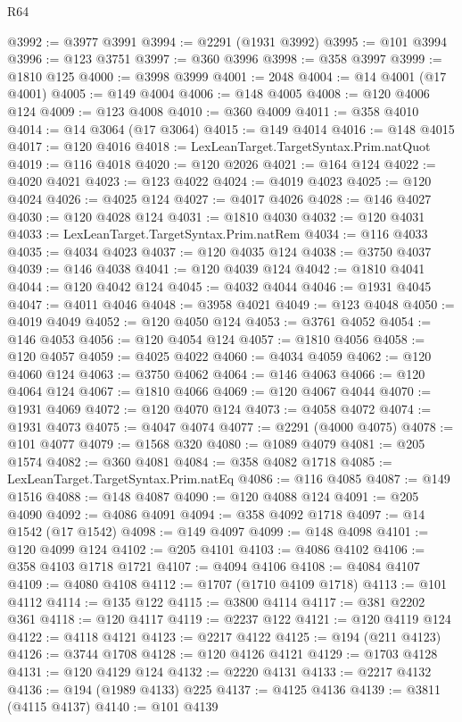 \begin{lexlean}{R64}
\begin{coremodule}
@3992 := @3977 @3991
@3994 := @2291 (@1931 @3992)
@3995 := @101 @3994
@3996 := @123 @3751
@3997 := @360 @3996
@3998 := @358 @3997
@3999 := @1810 @125
@4000 := @3998 @3999
@4001 := 2048
@4004 := @14 @4001 (@17 @4001)
@4005 := @149 @4004
@4006 := @148 @4005
@4008 := @120 @4006 @124
@4009 := @123 @4008
@4010 := @360 @4009
@4011 := @358 @4010
@4014 := @14 @3064 (@17 @3064)
@4015 := @149 @4014
@4016 := @148 @4015
@4017 := @120 @4016
@4018 := LexLeanTarget.TargetSyntax.Prim.natQuot
@4019 := @116 @4018
@4020 := @120 @2026
@4021 := @164 @124
@4022 := @4020 @4021
@4023 := @123 @4022
@4024 := @4019 @4023
@4025 := @120 @4024
@4026 := @4025 @124
@4027 := @4017 @4026
@4028 := @146 @4027
@4030 := @120 @4028 @124
@4031 := @1810 @4030
@4032 := @120 @4031
@4033 := LexLeanTarget.TargetSyntax.Prim.natRem
@4034 := @116 @4033
@4035 := @4034 @4023
@4037 := @120 @4035 @124
@4038 := @3750 @4037
@4039 := @146 @4038
@4041 := @120 @4039 @124
@4042 := @1810 @4041
@4044 := @120 @4042 @124
@4045 := @4032 @4044
@4046 := @1931 @4045
@4047 := @4011 @4046
@4048 := @3958 @4021
@4049 := @123 @4048
@4050 := @4019 @4049
@4052 := @120 @4050 @124
@4053 := @3761 @4052
@4054 := @146 @4053
@4056 := @120 @4054 @124
@4057 := @1810 @4056
@4058 := @120 @4057
@4059 := @4025 @4022
@4060 := @4034 @4059
@4062 := @120 @4060 @124
@4063 := @3750 @4062
@4064 := @146 @4063
@4066 := @120 @4064 @124
@4067 := @1810 @4066
@4069 := @120 @4067 @4044
@4070 := @1931 @4069
@4072 := @120 @4070 @124
@4073 := @4058 @4072
@4074 := @1931 @4073
@4075 := @4047 @4074
@4077 := @2291 (@4000 @4075)
@4078 := @101 @4077
@4079 := @1568 @320
@4080 := @1089 @4079
@4081 := @205 @1574
@4082 := @360 @4081
@4084 := @358 @4082 @1718
@4085 := LexLeanTarget.TargetSyntax.Prim.natEq
@4086 := @116 @4085
@4087 := @149 @1516
@4088 := @148 @4087
@4090 := @120 @4088 @124
@4091 := @205 @4090
@4092 := @4086 @4091
@4094 := @358 @4092 @1718
@4097 := @14 @1542 (@17 @1542)
@4098 := @149 @4097
@4099 := @148 @4098
@4101 := @120 @4099 @124
@4102 := @205 @4101
@4103 := @4086 @4102
@4106 := @358 @4103 @1718 @1721
@4107 := @4094 @4106
@4108 := @4084 @4107
@4109 := @4080 @4108
@4112 := @1707 (@1710 @4109 @1718)
@4113 := @101 @4112
@4114 := @135 @122
@4115 := @3800 @4114
@4117 := @381 @2202 @361
@4118 := @120 @4117
@4119 := @2237 @122
@4121 := @120 @4119 @124
@4122 := @4118 @4121
@4123 := @2217 @4122
@4125 := @194 (@211 @4123)
@4126 := @3744 @1708
@4128 := @120 @4126 @4121
@4129 := @1703 @4128
@4131 := @120 @4129 @124
@4132 := @2220 @4131
@4133 := @2217 @4132
@4136 := @194 (@1989 @4133) @225
@4137 := @4125 @4136
@4139 := @3811 (@4115 @4137)
@4140 := @101 @4139

\end{coremodule}
\end{lexlean}
